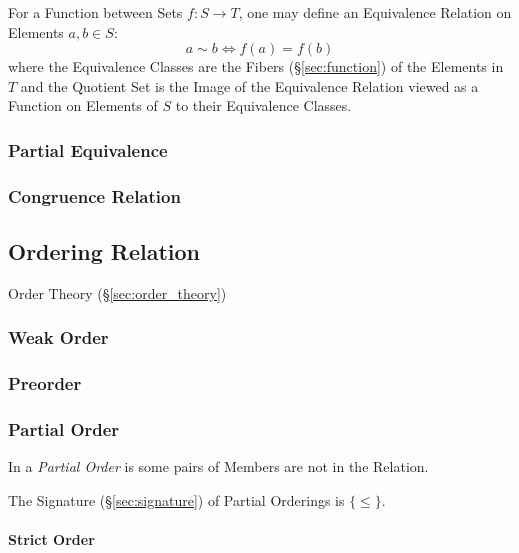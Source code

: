 For a Function between Sets $f : S \rightarrow T$, one may define an
Equivalence Relation on Elements $a,b \in S$:
\[
    a \sim b \Leftrightarrow f(a) = f(b)
\]
where the Equivalence Classes are the Fibers (\S\ref{sec:function}) of
the Elements in $T$ and the Quotient Set is the Image of the
Equivalence Relation viewed as a Function on Elements of $S$ to their
Equivalence Classes.



\subsubsection{Partial Equivalence}\label{sec:partial_equivalence}

\subsubsection{Congruence Relation}\label{sec:congruence_relation}



\subsection{Ordering Relation}\label{sec:ordering_relation}

Order Theory (\S\ref{sec:order_theory})



\subsubsection{Weak Order}\label{sec:weak_order}

\subsubsection{Preorder}\label{sec:preorder}

\subsubsection{Partial Order}\label{sec:partial_order}

In a \emph{Partial Order} is some pairs of Members are not in the
Relation.

The Signature (\S\ref{sec:signature}) of Partial Orderings is
$\{\leq\}$.



\paragraph{Strict Order}\label{sec:strict_order}

